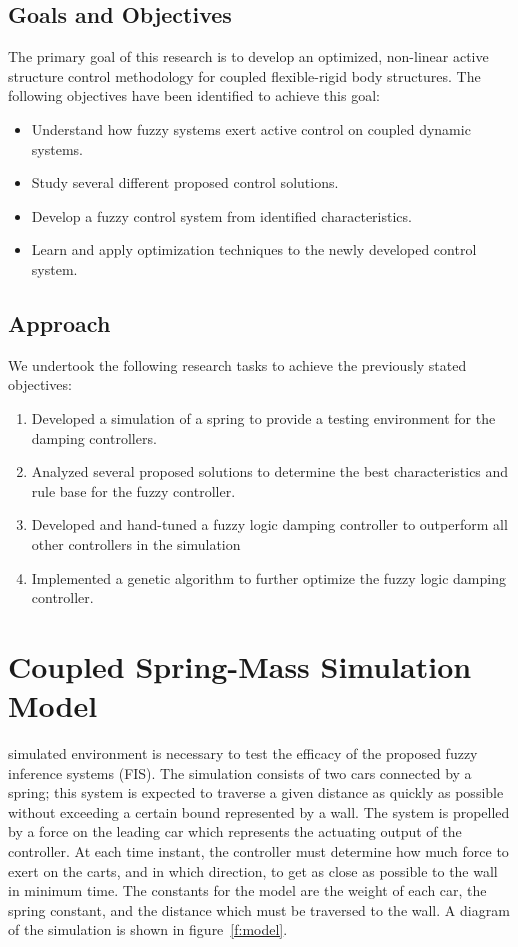 \documentclass[submit]{aiaa-tc}%
\begin{document}
\subsection{Goals and Objectives}
The primary goal of this research is to develop  an optimized, non-linear active structure control methodology for coupled flexible-rigid body structures. The following objectives have been identified to achieve this goal:

\begin{itemize}
\item Understand how fuzzy systems exert active control on coupled dynamic systems.
\item Study several different proposed control solutions\cite{walker:13p,stimetz:13p,mitchell:13p,vick:13p}.
\item Develop a fuzzy control system from identified characteristics.
\item Learn and apply optimization techniques to the  newly developed control system.
\end{itemize}

\subsection{Approach}
We undertook the following research tasks to achieve the previously stated objectives:
\begin{enumerate}
\item Developed a simulation  of a spring to provide a testing environment for the damping controllers.
\item Analyzed several proposed solutions to determine the best characteristics and rule base for the fuzzy controller.
\item Developed and hand-tuned a fuzzy logic damping controller to outperform all other controllers in the simulation
\item Implemented a genetic algorithm to further optimize the fuzzy logic damping controller.
\end{enumerate}

\section{Coupled Spring-Mass Simulation Model}\label{s:model}
 simulated environment is necessary to test the efficacy of the proposed fuzzy inference systems (FIS). The simulation consists of two cars connected by a spring; this system is expected to traverse a given distance as quickly as possible without exceeding a certain bound represented by a wall. The system is propelled by a force on the leading car which represents the actuating output of the controller. At each time instant, the controller must determine how much force to exert on the carts, and in which direction, to get as close as possible to the wall in minimum time. The constants for the model are the weight of each car, the spring constant, and the distance which must be traversed to the wall. A diagram of the simulation is shown in figure~\vref{f:model}.
\end{document}
